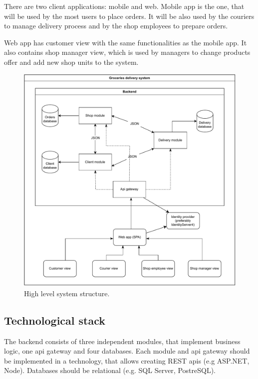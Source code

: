 \documentclass[../main.tex]{subfiles}
\begin{document}
There are two client applications: mobile and web. Mobile app is the one, that will be used by the most users to place orders. It will be also used by the couriers to manage delivery process and by the shop employees to prepare orders. 

Web app has customer view with the same functionalities as the mobile app. It also contains shop manager view, which is used by managers to change products offer and add new shop units to the system.

\newpage

\begin{figure}[h!]
\caption{High level system structure.}
\vspace{5mm}
\centering
\includegraphics[width=\textwidth]
{diagrams/architecture.pdf}
\end{figure}

\subsection{Technological stack}

The backend consists of three independent modules, that implement business logic, one api gateway and four databases. Each module and api gateway should be implemented in a technology, that allows creating REST apis (e.g ASP.NET, Node). Databases should be relational (e.g. SQL Server, PostreSQL).
\end{document}
